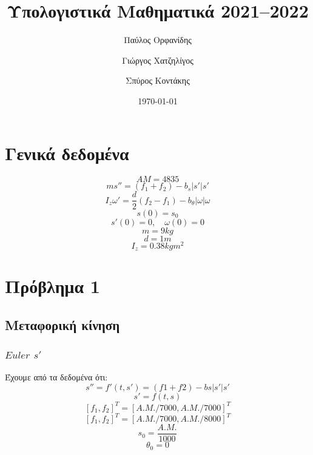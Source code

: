 \documentclass[a4paper]{article}
\author{Παύλος Ορφανίδης \and Γιώργος Χατζηλίγος \and Σπύρος Κοντάκης}
\date{\today}
\title{Υπολογιστικά Μαθηματικά 2021--2022}
\begin{document}
    \maketitle
    \tableofcontents


    \section*{Γενικά δεδομένα}
        \begin{equation}
            AM = 4835
        \end{equation}
        \begin{equation}
            ms'' = (f_1+f_2)-b_s\rvert s' \lvert s'
        \end{equation}
        \begin{equation}
            I_z\omega '=\frac{d}{2}(f_2-f_1)-b_{\theta}\rvert\omega\lvert\omega
        \end{equation}
        \begin{equation}
            s(0)=s_0
        \end{equation}
        \begin{equation}
            s'(0)=0,\quad \omega(0)=0
        \end{equation}
        \[m=9kg\]
        \[d=1m\]
        \[I_z=0.38 kgm^2\]
    \section{Πρόβλημα 1}
        \subsection*{Μεταφορική κίνηση}
        \subsubsection*{$Euler$ $s'$}
        Έχουμε από τα δεδομένα ότι:
        \begin{equation}
            s''=f'(t,s')=(f1+f2)-bs|s'|s'
        \end{equation}
        \begin{equation}
            s'=f(t,s)
        \end{equation}
        \[{[f_1,f_2]}^T={[A.M./7000, A.M./7000]}^T\]
        \[{[f_1,f_2]}^T={[A.M./7000, A.M./8000]}^T\]
        \[s_0=\frac{A.M.}{1000}\]
        \[\theta_0=0\]
\end{document}
